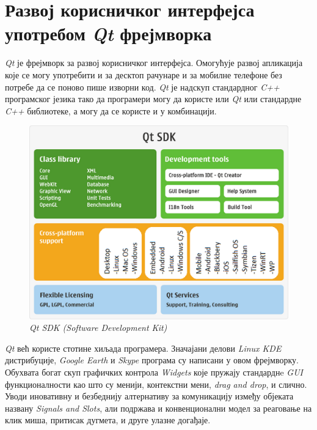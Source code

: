 \documentclass[12pt,a4paper,serbian,oneside]{book}
\begin{document}
%
%
%

\chapter{Развој корисничког интерфејса употребом \textit{Qt} фрејмворка}

\textit{Qt} \cite{qt} је фрејмворк за развој корисничког интерфејса. Омогућује развој апликација које се могу употребити и за десктоп рачунаре и за мобилне телефоне без потребе да се поново пише изворни код. \textit{Qt} је надскуп стандардног \textit{C++} програмског језика тако да програмери могу да користе или \textit{Qt} или стандардне \textit{C++} библиотеке, а могу да се користе и у комбинацији.

\begin{figure}[htb]
\begin{center}
\includegraphics[width=150mm]{images/qt_platforms.png}
\end{center}
\caption{\textit{Qt SDK (Software Development Kit)}}
\label{fig:qtsdk}
\end{figure}

\textit{Qt} већ користе стотине хиљада програмера. Значајани делови \textit{Linux KDE} дистрибуције, \textit{Google Earth} и \textit{Skype} програма су написани у овом фрејмворку. Обухвата богат скуп графичких контрола \textit{Widgets} које пружају стандарднe \textit{GUI} функционалности као што су менији, контекстни мени, \textit{drag and drop}, и слично. Уводи иновативну и безбеднију алтернативу за комуникацију између објеката названу \textit{Signals and Slots}, али подржава и конвенционални модел за реаговање на клик миша, притисак дугмета, и друге улазне догађаје.
\end{document}
